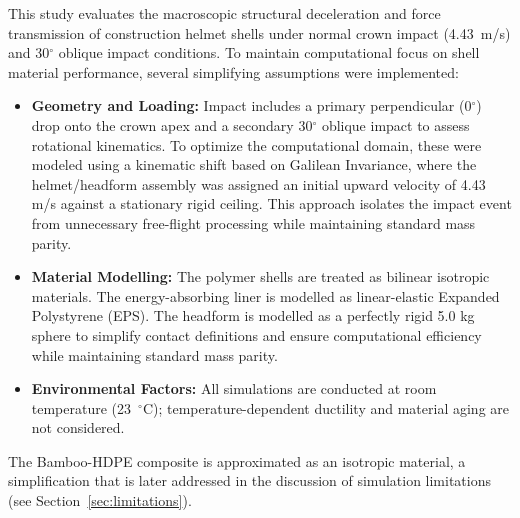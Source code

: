 This study evaluates the macroscopic structural deceleration and 
force transmission of construction helmet shells under normal crown 
impact (4.43~m/s) and 30$^\circ$ oblique impact conditions. To 
maintain computational focus on shell material performance, several 
simplifying assumptions were implemented:
\begin{itemize}
    \item \textbf{Geometry and Loading:} Impact includes a primary perpendicular (\texorpdfstring{0$^\circ$}{0 degrees}) drop onto the crown apex and a secondary \texorpdfstring{30$^\circ$}{30 degrees} oblique impact to assess rotational kinematics. To optimize the computational domain, these were modeled using a kinematic shift based on Galilean Invariance, where the helmet/headform assembly was assigned an initial upward velocity of 4.43 m/s against a stationary rigid ceiling. This approach isolates the impact event from unnecessary free-flight processing while maintaining standard mass parity.
    \item \textbf{Material Modelling:} The polymer shells are treated as bilinear isotropic materials. The energy-absorbing liner is modelled as linear-elastic Expanded Polystyrene (EPS). The headform is modelled as a perfectly rigid 5.0 kg sphere to simplify contact definitions and ensure computational efficiency while maintaining standard mass parity.
    \item \textbf{Environmental Factors:} All simulations are conducted at room temperature (\texorpdfstring{23~$^\circ$C}{23 degrees C}); temperature-dependent ductility and material aging are not considered.
\end{itemize}
The Bamboo-HDPE composite is approximated as an isotropic material, a simplification that is later addressed in the discussion of simulation limitations (see Section~\ref{sec:limitations}).
